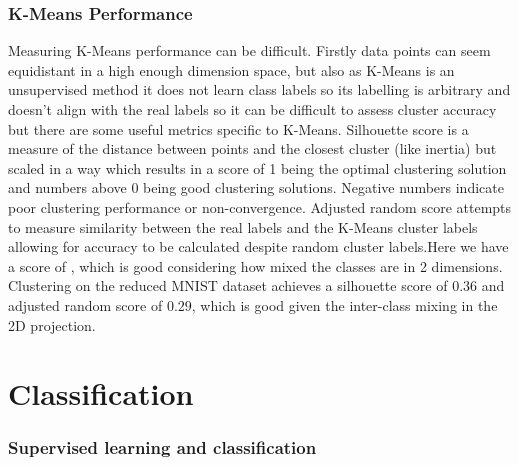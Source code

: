 \documentclass[11pt]{article}
\begin{document}

\subsubsection{K-Means Performance}

Measuring K-Means performance can be difficult. Firstly data points can seem equidistant in a high enough dimension space, but also as K-Means is an unsupervised method it does not learn class labels so its labelling is arbitrary and doesn't align with the real labels so it can be difficult to assess cluster accuracy but there are some useful metrics specific to K-Means. Silhouette score is a measure of the distance between points and the closest cluster (like inertia) but scaled in a way which results in a score of 1 being the optimal clustering solution and numbers above 0 being good clustering solutions. Negative numbers indicate poor clustering performance or non-convergence. Adjusted random score attempts to measure similarity between the real labels and the K-Means cluster labels allowing for accuracy to be calculated despite random cluster labels.Here we have a score of , which is good considering how mixed the classes are in 2 dimensions. Clustering on the reduced MNIST dataset achieves a silhouette score of $0.36$ and adjusted random score of $0.29$, which is good given the inter-class mixing in the 2D projection.

\newpage


\section{Classification}
\label{classifiers}

\subsubsection{Supervised learning and classification}
\label{supervised_learning}
\end{document}
